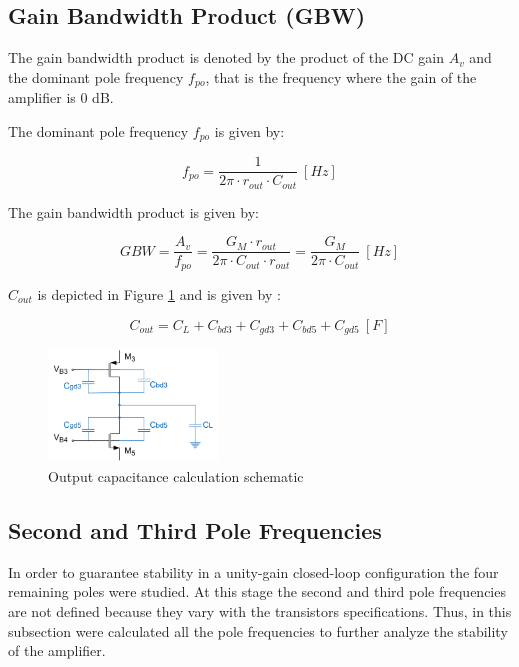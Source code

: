 \subsection{Gain Bandwidth Product (GBW)}
The gain bandwidth product is denoted by the product of the DC gain $A_v$ and the dominant pole frequency $f_{po}$, that is the frequency where the gain of the amplifier is 0 dB. 

The dominant pole frequency $f_{po}$ is given by:

\begin{equation}
    f_{po} = \frac{1}{2\pi \cdot r_{out} \cdot C_{out}} \ [Hz]
    \label{eq:fpo}
\end{equation}

The gain bandwidth product is given by:

\begin{equation}
    GBW = \frac{A_v}{f_{po}} = \frac{G_M \cdot r_{out}}{2\pi \cdot C_{out} \cdot r_{out}}=\frac{G_M}{2\pi \cdot C_{out}} \ [Hz]
    \label{eq:GBW}
\end{equation}

$C_{out}$ is depicted in Figure \ref{fig:cout_sch} and is given by :

\begin{equation}
    C_{out} = C_L + C_{bd3} + C_{gd3} + C_{bd5} + C_{gd5} \ [F]
    \label{eq:cout}
\end{equation}

\begin{figure}[H]
    \centering
    \includegraphics[width=0.4\textwidth]{Images/Cout_sch.png}
    \caption{Output capacitance calculation schematic}
    \label{fig:cout_sch}
\end{figure}

\subsection{Second and Third Pole Frequencies}
In order to guarantee stability in a unity-gain closed-loop configuration the four remaining poles were studied. At this stage the second and third pole frequencies are not defined because they vary with the transistors specifications. Thus, in this subsection were calculated all the pole frequencies to further analyze the stability of the amplifier. 

